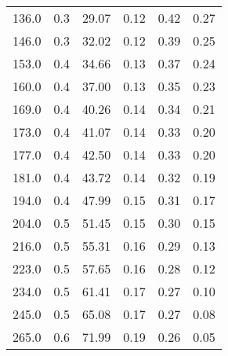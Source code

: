 \begin{tabular}{r@{ $\pm$ }lr@{ $\pm$ }l|cc}
 136.0 & 0.3 & 29.07 & 0.12 & 0.42 & 0.27 \\ 
 146.0 & 0.3 & 32.02 & 0.12 & 0.39 & 0.25 \\ 
 153.0 & 0.4 & 34.66 & 0.13 & 0.37 & 0.24 \\ 
 160.0 & 0.4 & 37.00 & 0.13 & 0.35 & 0.23 \\ 
 169.0 & 0.4 & 40.26 & 0.14 & 0.34 & 0.21 \\ 
 173.0 & 0.4 & 41.07 & 0.14 & 0.33 & 0.20 \\ 
 177.0 & 0.4 & 42.50 & 0.14 & 0.33 & 0.20 \\ 
 181.0 & 0.4 & 43.72 & 0.14 & 0.32 & 0.19 \\ 
 194.0 & 0.4 & 47.99 & 0.15 & 0.31 & 0.17 \\ 
 204.0 & 0.5 & 51.45 & 0.15 & 0.30 & 0.15 \\ 
 216.0 & 0.5 & 55.31 & 0.16 & 0.29 & 0.13 \\ 
 223.0 & 0.5 & 57.65 & 0.16 & 0.28 & 0.12 \\ 
 234.0 & 0.5 & 61.41 & 0.17 & 0.27 & 0.10 \\ 
 245.0 & 0.5 & 65.08 & 0.17 & 0.27 & 0.08 \\ 
 265.0 & 0.6 & 71.99 & 0.19 & 0.26 & 0.05 \\ 
 \end{tabular}